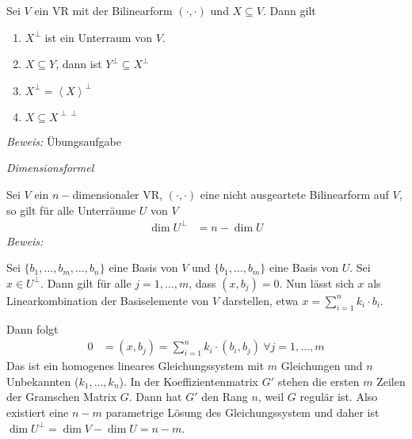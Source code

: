
\begin{mysatz}\label{eigenschaftenorthKomplement}

    Sei $V$ ein VR mit der Bilinearform $(\cdot , \cdot)$ und $X \subseteq V$.
    Dann gilt
    \begin{enumerate}
        \item $X^{\perp}$ ist ein Unterraum von $V$.
        \item $X \subseteq Y$, dann ist $Y^{\perp} \subseteq X^{\perp}$
        \item $X^{\perp} = \left\langle X \right\rangle^{\perp}$
        \item \label{EigOrthKompl4} $X \subseteq X^{\perp\perp}$
    \end{enumerate}
\end{mysatz}
\textit{Beweis:} Übungsaufgabe


\begin{mylemma} \label{dimensionsformelorthKomplement} \textit{Dimensionsformel}

    Sei $V$ ein $n-$dimensionaler VR, $(\cdot , \cdot )$ eine nicht ausgeartete Bilinearform auf $V$, so gilt für alle Unterräume $U$ von $V$
    \begin{align*}
        \dim U^{\perp} & = n - \dim U
    \end{align*}
    \textit{Beweis:}

    Sei $\{ b_1, \ldots, b_m, \ldots, b_n \}$ eine Basis von $V$ und $\{ b_1, \ldots, b_m \}$ eine Basis von $U$.
    Sei $x \in U^{\perp}$.
    Dann gilt für alle $j = 1, \ldots, m$, dass $(x, b_j) = 0$.
    Nun lässt sich $x$ als Linearkombination der Basiselemente von $V$ darstellen, etwa $\displaystyle{x=\sum_{i=1}^n k_i\cdot b_i}$.

    Dann folgt
    \begin{align*}
        0 & = (x, b_j) = \sum\limits_{i = 1}^n k_i \cdot (b_i, b_j) \ \forall j = 1, \ldots, m
    \end{align*}
    Das ist ein homogenes lineares Gleichungssystem mit $m$ Gleichungen und $n$ Unbekannten ($k_1, \ldots, k_n$).
    In der Koeffizientenmatrix $G'$ stehen die ersten $m$ Zeilen der Gramschen Matrix $G$.
    Dann hat $G'$ den Rang $n$, weil $G$ regulär ist.
    Also existiert eine $n-m$ parametrige Lösung des Gleichungssystem und daher ist $\dim U^{\perp} = \dim V - \dim U = n-m$.
\end{mylemma}

